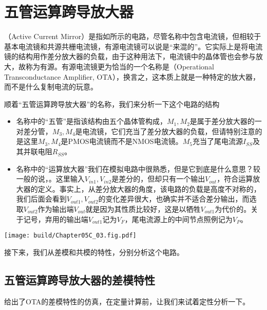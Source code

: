 \section{五管运算跨导放大器}
（Active Current Mirror）是指如所示的电路，尽管名称中包含电流镜，但相较于基本电流镜和共源共栅电流镜，有源电流镜可以说是“来混的”。它实际上是将电流镜的结构用作差分放大器的负载，由于这种用法下，电流镜中的晶体管也会参与放大，故称为有源。有源电流镜更为恰当的一个名称是（Operational Transconductance Amplifier, OTA），换言之，这本质上就是一种特定的放大器，而不是什么复制电流的玩意。

顺着“五管运算跨导放大器”的名称，我们来分析一下这个电路的结构
\begin{itemize}
    \item 名称中的“五管”是指该结构由五个晶体管构成，$M_1,M_2$是属于差分放大器的一对差分管，$M_3,M_4$是电流镜，它们充当了差分放大器的负载，但请特别注意的是这里$M_3,M_4$是PMOS电流镜而不是NMOS电流镜。$M_5$充当了尾电流源$I_{SS}$及其并联电阻$R_{SS}$。
    \item 名称中的“运算放大器”我们在模拟电路中很熟悉，但是它到底是什么意思？较一般的说，。这里输入$V_{in1},V_{in2}$是差分的，但却只有一个输出$V_{out}$，符合运算放大器的定义。事实上，从差分放大器的角度，该电路的负载是高度不对称的，我们后面会看到$V_{out1},V_{out2}$的变化差异很大，也确实并不适合差分输出，而选取$V_{out2}$作为输出端$V_{out}$就是因为其性质比较好，这是以牺牲$V_{out1}$为代价的。关于记号，弃用的输出端$V_{out1}$记为$V_F$，尾电流源上的中间节点照例记为$V_P$。
\end{itemize}

\begin{Figure}[五管运算跨导放大器]
    \texttt{[image: build/Chapter05C\_03.fig.pdf]}
\end{Figure}

接下来，我们从差模和共模的特性，分别分析这个电路。

\subsection{五管运算跨导放大器的差模特性}
给出了OTA的差模特性的仿真，在定量计算前，让我们来试着定性分析一下。

